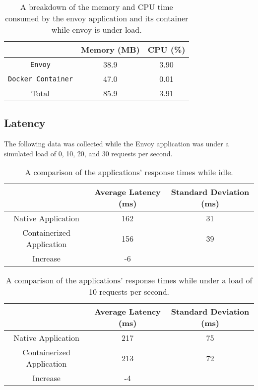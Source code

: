 \documentclass{article}
\begin{document}
\begin{table}[H]
\begin{tabular}{ |c|c|c| }
 \hline
   & Memory (MB) & CPU (\%) \\ 
 \hline
 \texttt{Envoy} & 38.9 & 3.90 \\
 \hline
 \texttt{Docker Container} & 47.0 & 0.01 \\
 \hline\hline
 Total & 85.9 & 3.91 \\
 \hline
\end{tabular}
\caption{A breakdown of the memory and CPU time consumed by the envoy application and its container while envoy is under load.}
\label{app-consumption-under-load-breakdown}
\end{table}

\subsection{Latency}
The following data was collected while the Envoy application was under a simulated load of 0, 10, 20, and 30 requests per second.

\begin{table}[H]
\begin{tabular}{ |c|c|c| }
 \hline
 & Average Latency (ms) & Standard Deviation (ms) \\
 \hline
 Native Application & 162 & 31 \\
 \hline
 Containerized Application & 156 & 39 \\
 \hline\hline
 Increase & -6 & \\
 \hline
\end{tabular}
\caption{A comparison of the applications' response times while idle.}
\label{idle-latency}
\end{table}

\begin{table}[H]
\begin{tabular}{ |c|c|c| }
 \hline
 & Average Latency (ms) & Standard Deviation (ms) \\
 \hline
 Native Application & 217 & 75 \\
 \hline
 Containerized Application & 213 & 72 \\
 \hline\hline
 Increase & -4 & \\
 \hline
\end{tabular}
\caption{A comparison of the applications' response times while under a load of 10 requests per second.}
\label{latency-under-load-10}
\end{table}
\end{document}

